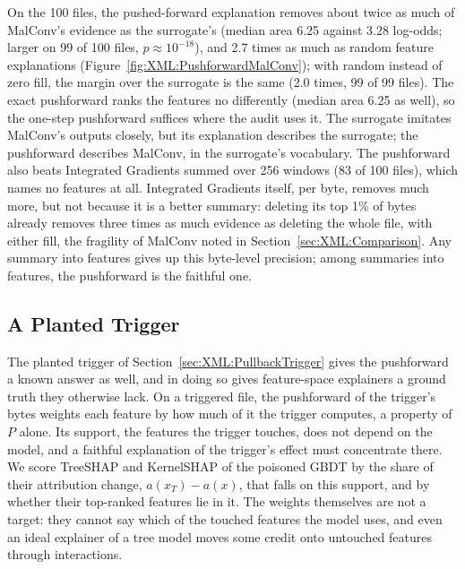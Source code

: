 

On the 100 files, the pushed-forward explanation removes about twice as much of MalConv's evidence as the surrogate's
(median area 6.25 against 3.28 log-odds; larger on 99 of 100 files, $p \approx 10^{-18}$), and 2.7 times as much as
random feature explanations (Figure~\ref{fig:XML:PushforwardMalConv}); with random instead of zero fill, the margin
over the surrogate is the same (2.0 times, 99 of 99 files). The exact pushforward ranks the features no differently
(median area 6.25 as well), so the one-step pushforward suffices where the audit uses it. The surrogate imitates MalConv's outputs closely, but its
explanation describes the surrogate; the pushforward describes MalConv, in the surrogate's vocabulary. The pushforward
also beats Integrated Gradients summed over 256 windows (83 of 100 files), which names no features at all. Integrated
Gradients itself, per byte, removes much more, but not because it is a better summary: deleting its top 1\% of bytes
already removes three times as much evidence as deleting the whole file, with either fill, the fragility of MalConv
noted in Section~\ref{sec:XML:Comparison}. Any summary into features gives up this byte-level precision; among
summaries into features, the pushforward is the faithful one.

\subsection{A Planted Trigger}
\label{sec:XML:PushforwardTrigger}

The planted trigger of Section~\ref{sec:XML:PullbackTrigger} gives the pushforward a known answer as well, and in
doing so gives feature-space explainers a ground truth they otherwise lack. On a triggered file, the pushforward of the
trigger's bytes weights each feature by how much of it the trigger computes, a property of $P$ alone. Its support, the
features the trigger touches, does not depend on the model, and a faithful explanation of the trigger's effect must
concentrate there. We score TreeSHAP and KernelSHAP of the poisoned GBDT by the share of their attribution change,
$a(x_T) - a(x)$, that falls on this support, and by whether their top-ranked features lie in it. The weights themselves
are not a target: they cannot say which of the touched features the model uses, and even an ideal explainer of a tree
model moves some credit onto untouched features through interactions.

